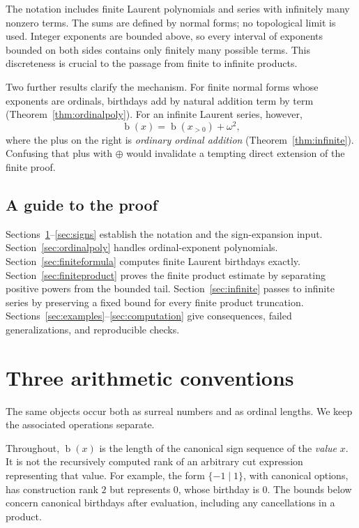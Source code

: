 \documentclass[11pt,letterpaper]{article}
\numberwithin{equation}{section}
\theoremstyle{definition}
\theoremstyle{remark}
\newcommand{\bd}{\operatorname{b}}
\begin{document}
The notation includes finite Laurent polynomials and series with infinitely
many nonzero terms. The sums are defined by normal forms; no topological limit
is used. Integer exponents are bounded above, so every interval
of exponents bounded on both sides contains only finitely many possible terms.
This discreteness is crucial to the passage from finite to infinite products.

Two further results clarify the mechanism. For finite normal forms whose
exponents are ordinals, birthdays add by natural addition term by term
(Theorem~\ref{thm:ordinalpoly}). For an infinite Laurent series, however,
\begin{equation}\label{eq:infinite-preview}
 \bd(x)=\bd(x_{>0})+\omega^2,
\end{equation}
where the plus on the right is \emph{ordinary ordinal addition}
(Theorem~\ref{thm:infinite}). Confusing that plus with $\oplus$ would invalidate
a tempting direct extension of the finite proof.

\subsection{A guide to the proof}
Sections~\ref{sec:conventions}--\ref{sec:signs} establish the notation and the
sign-expansion input. Section~\ref{sec:ordinalpoly} handles ordinal-exponent
polynomials. Section~\ref{sec:finiteformula} computes finite Laurent birthdays
exactly. Section~\ref{sec:finiteproduct} proves the finite product estimate by
separating positive powers from the bounded tail. Section~\ref{sec:infinite}
passes to infinite series by preserving a fixed bound for every finite product
truncation. Sections~\ref{sec:examples}--\ref{sec:computation} give consequences,
failed generalizations, and reproducible checks.

\section{Three arithmetic conventions}
\label{sec:conventions}
The same objects occur both as surreal numbers and as ordinal lengths. We keep
the associated operations separate.

Throughout, $\bd(x)$ is the length of the canonical sign sequence of the
\emph{value} $x$. It is not the recursively computed rank of an arbitrary
cut expression representing that value. For example, the form
$\{-1\mid1\}$, with canonical options, has construction rank $2$ but
represents $0$, whose birthday is $0$. The bounds below concern canonical
birthdays after evaluation, including any cancellations in a product.
\end{document}
